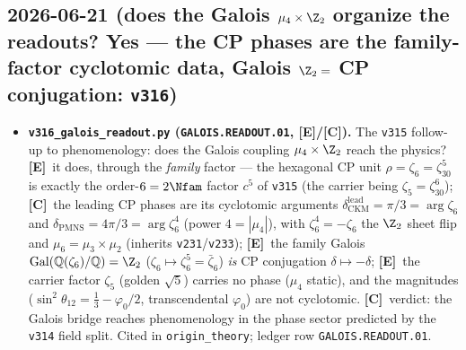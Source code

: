 \documentclass[11pt]{article}
\providecommand{\mE}{\textbf{[E]}}\providecommand{\mC}{\textbf{[C]}}
\begin{document}
\subsection*{2026-06-21 (does the Galois $\mu_4\times\Z_2$ organize the readouts? Yes --- the CP phases are the family-factor cyclotomic data, Galois $\Z_2=$ CP conjugation: \texttt{v316})}
\begin{itemize}
\item \textbf{\texttt{v316\_galois\_readout.py} (\texttt{GALOIS.READOUT.01}, \mE/\mC).} The \texttt{v315} follow-up to
  phenomenology: does the Galois coupling $\mu_4\times\Z_2$ reach the physics? \mE\ it does, through the \emph{family}
  factor --- the hexagonal CP unit $\rho=\zeta_6=\zeta_{30}^5$ is exactly the order-$6=2\Nfam$ factor $c^5$ of
  \texttt{v315} (the carrier being $\zeta_5=\zeta_{30}^6$); \mC\ the leading CP phases are its cyclotomic arguments
  $\delta_{\mathrm{CKM}}^{\mathrm{lead}}=\pi/3=\arg\zeta_6$ and $\delta_{\mathrm{PMNS}}=4\pi/3=\arg\zeta_6^4$ (power
  $4=|\mu_4|$), with $\zeta_6^4=-\zeta_6$ the $\Z_2$ sheet flip and $\mu_6=\mu_3\times\mu_2$ (inherits
  \texttt{v231}/\texttt{v233}); \mE\ the family Galois $\mathrm{Gal}(\mathbb Q(\zeta_6)/\mathbb Q)=\Z_2$
  ($\zeta_6\mapsto\zeta_6^5=\bar\zeta_6$) \emph{is} CP conjugation $\delta\mapsto-\delta$; \mE\ the carrier factor
  $\zeta_5$ (golden $\sqrt5$) carries no phase ($\mu_4$ static), and the magnitudes
  ($\sin^2\theta_{12}=\tfrac13-\varphi_0/2$, transcendental $\varphi_0$) are not cyclotomic. \mC\ verdict: the Galois
  bridge reaches phenomenology in the phase sector predicted by the \texttt{v314} field split. Cited in
  \texttt{origin\_theory}; ledger row \texttt{GALOIS.READOUT.01}.
\end{itemize}
\end{document}
